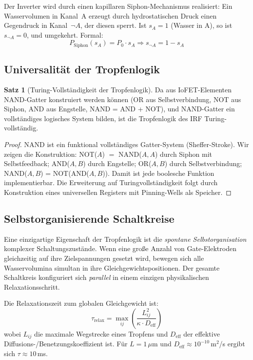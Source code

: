 ﻿\documentclass[a4paper,12pt]{scrreprt}
\theoremstyle{definition}
\newtheorem{satz}{Satz}[section]
\begin{document}
Der Inverter wird durch einen kapillaren Siphon-Mechanismus realisiert:
Ein Wasservolumen in Kanal~A erzeugt durch hydrostatischen Druck einen
Gegendruck in Kanal~$\neg A$, der diesen sperrt. Ist $s_A = 1$ (Wasser
in A), so ist $s_{\neg A} = 0$, und umgekehrt. Formal:
\begin{equation}
	P_{\mathrm{Siphon}}(s_A) = P_0 \cdot s_A \Rightarrow s_{\neg A} = 1 - s_A
	\label{eq:not_gatter}
\end{equation}

\subsection{Universalität der Tropfenlogik}

\begin{satz}[Turing-Vollständigkeit der Tropfenlogik]
	Da aus IoFET-Elementen NAND-Gatter konstruiert werden können (OR aus
	Selbstverbindung, NOT aus Siphon, AND aus Engstelle, NAND = AND + NOT),
	und NAND-Gatter ein vollständiges logisches System bilden, ist die
	Tropfenlogik des IRF Turing-vollständig.
\end{satz}

\begin{proof}
	NAND ist ein funktional vollständiges Gatter-System (Sheffer-Stroke).
	Wir zeigen die Konstruktion: NOT($A$) $=$ NAND($A, A$) durch Siphon mit
	Selbstfeedback; AND($A, B$) durch Engstelle; OR($A, B$) durch Selbstverbindung;
	NAND($A, B$) = NOT(AND($A, B$)). Damit ist jede boolesche Funktion
	implementierbar. Die Erweiterung auf Turingvollständigkeit folgt durch
	Konstruktion eines universellen Registers mit Pinning-Wells als Speicher.
\end{proof}

\subsection{Selbstorganisierende Schaltkreise}

Eine einzigartige Eigenschaft der Tropfenlogik ist die \emph{spontane
	Selbstorganisation} komplexer Schaltungszustände. Wenn eine große Anzahl
von Gate-Elektroden gleichzeitig auf ihre Zielspannungen gesetzt wird,
bewegen sich alle Wasservolumina simultan in ihre Gleichgewichtspositionen.
Der gesamte Schaltkreis konfiguriert sich \emph{parallel} in einem einzigen
physikalischen Relaxationsschritt.

Die Relaxationszeit zum globalen Gleichgewicht ist:
\begin{equation}
	\tau_{\mathrm{relax}} = \max_{ij} \left( \frac{L_{ij}^2}{\kappa \cdot D_{\mathrm{eff}}} \right)
	\label{eq:relaxationszeit}
\end{equation}
wobei $L_{ij}$ die maximale Wegstrecke eines Tropfens und $D_{\mathrm{eff}}$ der
effektive Diffusions-/Benetzungskoeffizient ist. Für $L = 1\,\mu$m und
$D_{\mathrm{eff}} \approx 10^{-10}$\,m$^2$/s ergibt sich $\tau \approx 10$\,ms.
\end{document}
